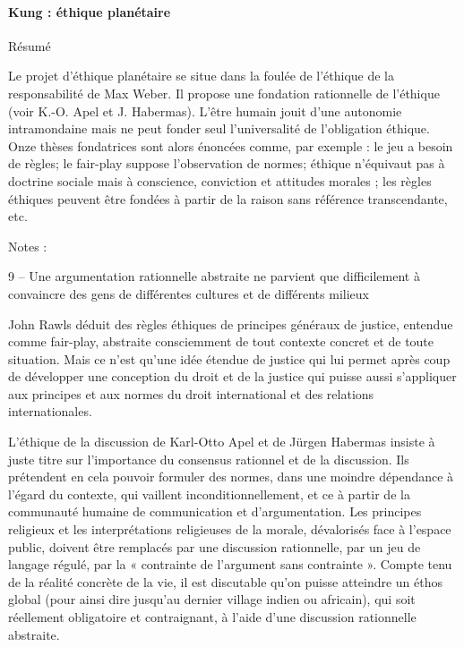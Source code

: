  \paragraph{Kung : éthique planétaire}
 \cite{kung_lethique_2009}
{Résumé}
\begin{singlequote}
Le projet d’éthique planétaire se situe dans la foulée de l’éthique de la responsabilité de Max Weber. Il propose une fondation rationnelle de l’éthique (voir K.-O. Apel et J. Habermas). L’être humain jouit d’une autonomie intramondaine mais ne peut fonder seul l’universalité de l’obligation éthique. Onze thèses fondatrices sont alors énoncées comme, par exemple : le jeu a besoin de règles; le fair-play suppose l’observation de normes; éthique n’équivaut pas à doctrine sociale mais à conscience, conviction et attitudes morales ; les règles éthiques peuvent être fondées à partir de la raison sans référence transcendante, etc.
        
\end{singlequote}
    
Notes :
\begin{singlequote}

9 – Une argumentation rationnelle abstraite ne parvient que difficilement à convaincre des gens de différentes cultures et de différents milieux

John Rawls déduit des règles éthiques de principes généraux de justice, entendue comme fair-play, abstraite consciemment de tout contexte concret et de toute situation. Mais ce n’est qu’une idée étendue de justice qui lui permet après coup de développer une conception du droit et de la justice qui puisse aussi s’appliquer aux principes et aux normes du droit international et des relations internationales.

L’éthique de la discussion de Karl-Otto Apel et de Jürgen Habermas insiste à juste titre sur l’importance du consensus rationnel et de la discussion. Ils prétendent en cela pouvoir formuler des normes, dans une moindre dépendance à l’égard du contexte, qui vaillent inconditionnellement, et ce à partir de la communauté humaine de communication et d’argumentation. Les principes religieux et les interprétations religieuses de la morale, dévalorisés face à l’espace public, doivent être remplacés par une discussion rationnelle, par un jeu de langage régulé, par la « contrainte de l’argument sans contrainte ». Compte tenu de la réalité concrète de la vie, il est discutable qu’on puisse atteindre un éthos global (pour ainsi dire jusqu’au dernier village indien ou africain), qui soit réellement obligatoire et contraignant, à l’aide d’une discussion rationnelle abstraite.
\end{singlequote}

